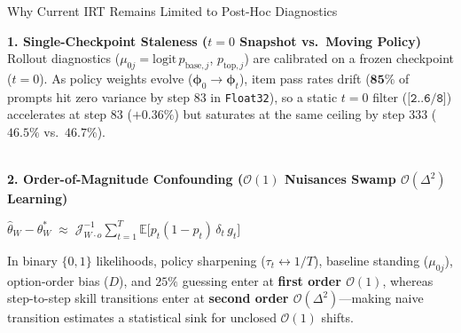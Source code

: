 \documentclass[aspectratio=169, 10pt]{beamer}
\begin{document}
\begin{frame}{Why Current IRT Remains Limited to Post-Hoc Diagnostics}
  \footnotesize
  \vspace{-1.5mm}

  \noindent\textbf{\color{NavyHeader}1. Single-Checkpoint Staleness ($t=0$ Snapshot vs.\ Moving Policy)}\\[0.6mm]
  Rollout diagnostics ($\mu_{0j} = \mathrm{logit}\,p_{\mathrm{base},j}$, $p_{\mathrm{top},j}$) are calibrated on a frozen checkpoint ($t=0$). As policy weights evolve ($\boldsymbol{\phi}_0 \to \boldsymbol{\phi}_t$), item pass rates drift ($\mathbf{85\%}$ of prompts hit zero variance by step $83$ in \texttt{Float32}), so a static $t=0$ filter ($\texttt{[2..6/8]}$) accelerates at step $83$ ($+0.36\%$) but saturates at the same ceiling by step $333$ ($\mathbf{46.5\%}$ vs.\ $\mathbf{46.7\%}$).\par

  \vspace{1.2mm}
  \noindent{\color{BorderGray}\rule{\linewidth}{0.4pt}}\\[1.0mm]
  \textbf{\color{NavyHeader}2. Order-of-Magnitude Confounding ($\mathcal{O}(1)$ Nuisances Swamp $\mathcal{O}(\Delta^2)$ Learning)}\\[0.6mm]
  {\centering $\displaystyle \hat{\theta}_W - \theta_W^* \;\approx\; \mathcal{J}_{W\cdot o}^{-1}\textstyle\sum_{t=1}^T \mathbb{E}\bigl[p_t(1-p_t)\,\delta_t\,g_t\bigr]$\par}\vspace{0.6mm}
  In binary $\{0,1\}$ likelihoods, policy sharpening ($\tau_t \leftrightarrow 1/T$), baseline standing ($\mu_{0j}$), option-order bias ($D$), and $25\%$ guessing enter at \textbf{first order $\mathcal{O}(1)$}, whereas step-to-step skill transitions enter at \textbf{second order $\mathcal{O}(\Delta^2)$}—making naive transition estimates a statistical sink for unclosed $\mathcal{O}(1)$ shifts.\par


\end{frame}
\end{document}
